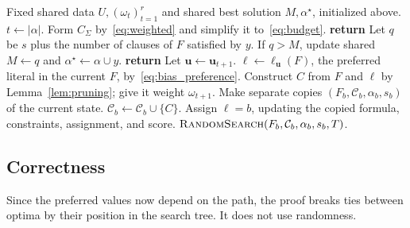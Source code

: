 \documentclass[11pt,a4paper]{article}
\theoremstyle{definition}
\theoremstyle{remark}
\begin{document}
\begin{algorithm}[tp]
\caption{\textnormal{\textsc{RandomSearch}}$(F,\mathcal C,\alpha,s,T)$}
\label{alg:random_search}
\begin{algorithmic}[1]
\REQUIRE Fixed shared data $U,(\omega_t)_{t=1}^r$ and shared best solution $M,\alpha^\star$, initialized above.
\STATE $t\gets|\alpha|$.
\STATE Form $C_\Sigma$ by~\eqref{eq:weighted} and simplify it to~\eqref{eq:budget}.
  \STATE \textbf{return}
\ENDIF
{}
    \STATE Let $q$ be $s$ plus the number of clauses of $F$ satisfied by $y$.
    \STATE If $q>M$, update shared $M\gets q$ and $\alpha^\star\gets\alpha\cup y$.
  \ENDFOR
  \STATE \textbf{return}
\ENDIF
\STATE Let $\mathbf u\gets\mathbf u_{t+1}$.
\STATE $\ell\gets\ell_{\mathbf u}(F)$, the preferred literal in the current $F$, by~\eqref{eq:bias_preference}.
\STATE Construct $C$ from $F$ and $\ell$ by Lemma~\ref{lem:pruning}; give it weight $\omega_{t+1}$.
  \STATE Make separate copies $(F_b,\mathcal C_b,\alpha_b,s_b)$ of the current state.
    \STATE $\mathcal C_b\gets\mathcal C_b\cup\{C\}$.
  \ENDIF
  \STATE Assign $\ell=b$, updating the copied formula, constraints, assignment, and score.
  \STATE $\textnormal{\textsc{RandomSearch}}(F_b,\mathcal C_b,\alpha_b,s_b,T)$.
\ENDFOR
\end{algorithmic}
\end{algorithm}

\subsection{Correctness}

Since the preferred values now depend on the path, the proof breaks ties
between optima by their position in the search tree. It does not use
randomness.
\end{document}
